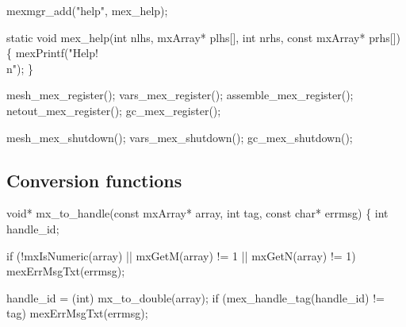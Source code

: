\nwenddocs{}\endmoddef
mexmgr_add("help", mex_help);
\nwendcode{}\nwdocspar

\nwenddocs{}\endmoddef
static void mex_help(int nlhs, mxArray* plhs[],
                     int nrhs, const mxArray* prhs[])
\{
    mexPrintf("Help!\\n");
\}

\nwendcode{}\nwdocspar

\nwenddocs{}\plusendmoddef
mesh_mex_register();
vars_mex_register();
assemble_mex_register();
netout_mex_register();
gc_mex_register();
\nwendcode{}\nwdocspar

\nwenddocs{}\plusendmoddef
mesh_mex_shutdown();
vars_mex_shutdown();
gc_mex_shutdown();
\nwendcode{}\nwdocspar


\subsection{Conversion functions}

\nwenddocs{}\endmoddef
void* mx_to_handle(const mxArray* array, int tag, const char* errmsg)
\{
    int handle_id;

    if (!mxIsNumeric(array) || mxGetM(array) != 1 || mxGetN(array) != 1)
        mexErrMsgTxt(errmsg);

    handle_id = (int) mx_to_double(array);
    if (mex_handle_tag(handle_id) != tag)
        mexErrMsgTxt(errmsg);


